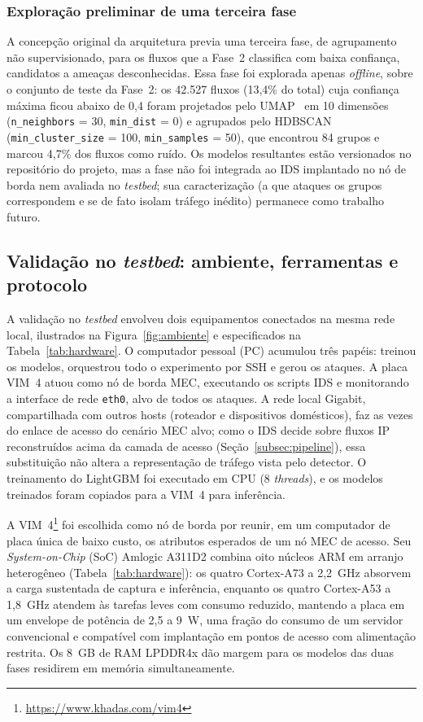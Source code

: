 \documentclass[12pt,a4paper]{article}
\begin{document}
\subsubsection{Exploração preliminar de uma terceira fase}
\label{subsubsec:fase3}

A concepção original da arquitetura previa uma terceira fase, de agrupamento
não supervisionado, para os fluxos que a Fase~2 classifica com baixa confiança,
candidatos a ameaças desconhecidas. Essa fase foi explorada apenas
\textit{offline}, sobre o conjunto de teste da Fase~2: os 42.527 fluxos (13,4\%
do total) cuja confiança máxima ficou abaixo de 0,4 foram projetados pelo
UMAP~\cite{mcinnes:18} em 10 dimensões (\texttt{n\_neighbors} = 30,
\texttt{min\_dist} = 0) e agrupados pelo HDBSCAN~\cite{mcinnes:17}
(\texttt{min\_cluster\_size} = 100, \texttt{min\_samples} = 50), que encontrou
84 grupos e marcou 4,7\% dos fluxos como ruído. Os modelos resultantes estão
versionados no repositório do projeto, mas a fase não foi integrada ao IDS
implantado no nó de borda nem avaliada no \textit{testbed}; sua caracterização
(a que ataques os grupos correspondem e se de fato isolam tráfego inédito)
permanece como trabalho futuro.

\subsection{Validação no \textit{testbed}: ambiente, ferramentas e protocolo}
\label{subsec:validacao}

A validação no \textit{testbed} envolveu dois equipamentos conectados na
mesma rede local, ilustrados na Figura~\ref{fig:ambiente} e especificados
na Tabela~\ref{tab:hardware}. O computador pessoal (PC) acumulou três papéis:
treinou os modelos, orquestrou todo o experimento por SSH e gerou os ataques. A
placa VIM~4 atuou como nó de borda MEC, executando os scripts IDS e monitorando a
interface de rede \texttt{eth0}, alvo de todos os ataques. A rede local Gigabit, compartilhada com outros hosts
(roteador e dispositivos domésticos), faz as vezes do enlace de acesso do cenário MEC alvo; como o IDS decide
sobre fluxos IP reconstruídos acima da camada de acesso
(Seção~\ref{subsec:pipeline}), essa substituição não altera a representação de
tráfego vista pelo detector. O treinamento do LightGBM foi executado em CPU
(8 \textit{threads}), e os modelos treinados foram copiados para a VIM~4 para
inferência.

A VIM~4\footnote{\url{https://www.khadas.com/vim4}} foi escolhida como nó de
borda por reunir, em um computador de placa única de baixo custo, os atributos
esperados de um nó MEC de acesso. Seu \textit{System-on-Chip} (SoC) Amlogic
A311D2 combina oito núcleos ARM em arranjo heterogêneo
(Tabela~\ref{tab:hardware}): os quatro Cortex-A73 a 2,2~GHz absorvem a carga
sustentada de captura e inferência, enquanto os quatro Cortex-A53 a 1,8~GHz
atendem às tarefas leves com consumo reduzido, mantendo a placa em um envelope
de potência de 2,5 a 9~W, uma fração do consumo de um servidor convencional e
compatível com implantação em pontos de acesso com alimentação restrita. Os
8~GB de RAM LPDDR4x dão margem para os modelos das duas fases residirem em
memória simultaneamente.
\end{document}
